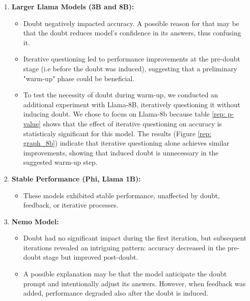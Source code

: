 \begin{enumerate}
  \item \textbf{Larger Llama Models (3B and 8B):}
    \begin{itemize}
      \item Doubt negatively impacted accuracy. A possible reason for that may be that the doubt reduces model's confidence in its answers, thus confusing it.
      \item Iterative questioning led to performance improvements at the pre-doubt stage (i.e before the doubt was induced), suggesting that a preliminary "warm-up" phase could be beneficial.
      \item To test the necessity of doubt during warm-up, we conducted an additional experiment with Llama-8B, iteratively questioning it without inducing doubt. We chose to focus on Llama-8b because table \ref{rep: p-value} shows that the effect of iterative questioning on accuracy is statisticaly significant for this model. The results (Figure \ref{rep: graph_8b}) indicate that iterative questioning alone achieves similar improvements, showing that induced doubt is unnecessary in the suggested warm-up step.
    \end{itemize}
  \item \textbf{Stable Performance (Phi, Llama 1B):}
    \begin{itemize}
      \item These models exhibited stable performance, unaffected by doubt, feedback, or iterative processes.
    \end{itemize}
  \item \textbf{Nemo Model:}
    \begin{itemize}
      \item Doubt had no significant impact during the first iteration, but subsequent iterations revealed an intriguing pattern: accuracy decreased in the pre-doubt stage but improved post-doubt.
      \item A possible explanation may be that the model anticipate the doubt prompt and intentionally adjust its answers. However, when feedback was added, performance degraded also after the doubt is induced.
    \end{itemize}
\end{enumerate}
